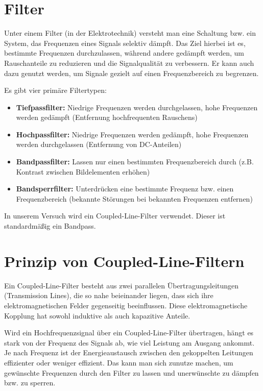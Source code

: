 \section{Filter}
Unter einem Filter (in der Elektrotechnik) versteht man eine Schaltung bzw. ein System, das Frequenzen eines Signals selektiv dämpft.
Das Ziel hierbei ist es, bestimmte Frequenzen durchzulassen, während andere gedämpft werden, um Rauschanteile zu reduzieren und die Signalqualität zu verbessern. Er kann auch dazu genutzt werden, um Signale gezielt auf einen Frequenzbereich zu begrenzen.

Es gibt vier primäre Filtertypen:
\begin{itemize}
    \item \textbf{Tiefpassfilter:} Niedrige Frequenzen werden durchgelassen, hohe Frequenzen werden gedämpft (Entfernung hochfrequenten Rauschens)
    \item \textbf{Hochpassfilter:} Niedrige Frequenzen werden gedämpft, hohe Frequenzen werden durchgelassen (Entfernung von DC-Anteilen)
    \item \textbf{Bandpassfilter:} Lassen nur einen bestimmten Frequenzbereich durch (z.B. Kontrast zwischen Bildelementen erhöhen)
    \item \textbf{Bandsperrfilter:} Unterdrücken eine bestimmte Frequenz bzw. einen Frequenzbereich (bekannte Störungen bei bekannten Frequenzen entfernen)
\end{itemize}

In unserem Versuch wird ein Coupled-Line-Filter verwendet. Dieser ist standardmäßig ein Bandpass.

\section{Prinzip von Coupled-Line-Filtern}
Ein Coupled-Line-Filter besteht aus zwei parallelen Übertragungsleitungen (Transmission Lines), 
die so nahe beieinander liegen, dass sich ihre elektromagnetischen Felder gegenseitig beeinflussen.
Diese elektromagnetische Kopplung hat sowohl induktive als auch kapazitive Anteile.

Wird ein Hochfrequenzsignal über ein Coupled-Line-Filter übertragen, hängt es stark
von der Frequenz des Signals ab, wie viel Leistung am Ausgang ankommt.
Je nach Frequenz ist der Energieaustausch zwischen den gekoppelten Leitungen effizienter oder weniger effizient.
Das kann man sich zunutze machen, um gewünschte Frequenzen durch den Filter zu lassen und unerwünschte zu dämpfen bzw. zu sperren.

